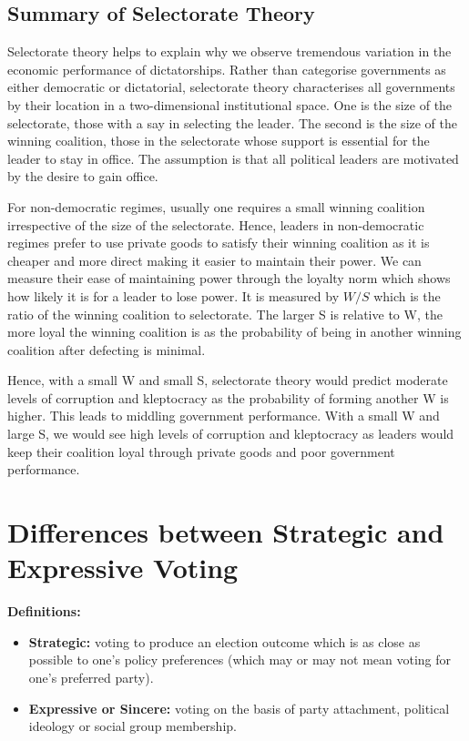 \documentclass[12pt, letterpaper]{article}
\begin{document}
\subsection{Summary of Selectorate Theory}
Selectorate theory helps to explain why we observe tremendous variation in the economic performance of dictatorships. Rather than categorise governments as either democratic or dictatorial, selectorate theory characterises all governments by their location in a two-dimensional institutional space. One is the size of the selectorate, those with a say in selecting the leader. The second is the size of the winning coalition, those in the selectorate whose support is essential for the leader to stay in office. The assumption is that all political leaders are motivated by the desire to gain office.

For non-democratic regimes, usually one requires a small winning coalition irrespective of the size of the selectorate. Hence, leaders in non-democratic regimes prefer to use private goods to satisfy their winning coalition as it is cheaper and more direct making it easier to maintain their power. We can measure their ease of maintaining power through the loyalty norm which shows how likely it is for a leader to lose power. It is measured by $W/S$ which is the ratio of the winning coalition to selectorate. The larger S is relative to W, the more loyal the winning coalition is as the probability of being in another winning coalition after defecting is minimal.

Hence, with a small W and small S, selectorate theory would predict moderate levels of corruption and kleptocracy as the probability of forming another W is higher. This leads to middling government performance. With a small W and large S, we would see high levels of corruption and kleptocracy as leaders would keep their coalition loyal through private goods and poor government performance.

\newpage
\section{Differences between Strategic and Expressive Voting}
\textbf{Definitions:}
\begin{itemize}
	\item \textbf{Strategic:} voting to produce an election outcome which is as close as possible to one's policy preferences (which may or may not mean voting for one's preferred party).
	\item \textbf{Expressive or Sincere:} voting on the basis of party attachment, political ideology or social group membership.
\end{itemize}
\end{document}
